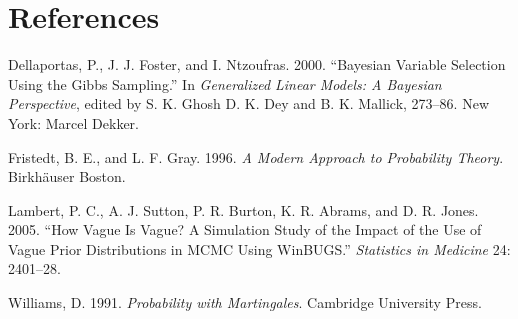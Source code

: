 \documentclass[
  12pt,
  a4paper,
  twoside]{book}
\newlength{\cslhangindent}
\newenvironment{cslreferences}%
  {\setlength{\parindent}{0pt}%
  \everypar{\setlength{\hangindent}{\cslhangindent}}\ignorespaces}%
  {\par}
\begin{document}
\hypertarget{references}{%
\chapter*{References}\label{references}}

\hypertarget{refs}{}
\begin{cslreferences}
\leavevmode\hypertarget{ref-dellas}{}%
Dellaportas, P., J. J. Foster, and I. Ntzoufras. 2000. ``Bayesian Variable Selection Using the Gibbs Sampling.'' In \emph{Generalized Linear Models: A Bayesian Perspective}, edited by S. K. Ghosh D. K. Dey and B. K. Mallick, 273--86. New York: Marcel Dekker.

\leavevmode\hypertarget{ref-Fristedt}{}%
Fristedt, B. E., and L. F. Gray. 1996. \emph{A Modern Approach to Probability Theory}. Birkhäuser Boston.

\leavevmode\hypertarget{ref-lambert}{}%
Lambert, P. C., A. J. Sutton, P. R. Burton, K. R. Abrams, and D. R. Jones. 2005. ``How Vague Is Vague? A Simulation Study of the Impact of the Use of Vague Prior Distributions in MCMC Using WinBUGS.'' \emph{Statistics in Medicine} 24: 2401--28.

\leavevmode\hypertarget{ref-Williams}{}%
Williams, D. 1991. \emph{Probability with Martingales}. Cambridge University Press.
\end{cslreferences}
\end{document}

